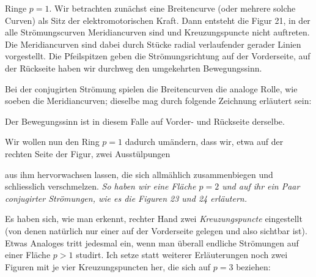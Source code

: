 \documentclass{article}
\begin{document}
Ringe $p = 1$. Wir betrachten zunächst eine Breitencurve (oder mehrere solche Curven) als Sitz der elektromotorischen Kraft. Dann entsteht die Figur 21, in der alle Strömungscurven Meridiancurven sind und Kreuzungspuncte nicht auftreten. Die Meridiancurven sind dabei durch Stücke radial verlaufender gerader Linien vorgestellt. Die Pfeilspitzen geben die Strömungsrichtung auf der Vorderseite, auf der Rückseite haben wir durchweg den umgekehrten Bewegungssinn.

Bei der conjugirten Strömung spielen die Breitencurven die analoge Rolle, wie soeben die Meridiancurven; dieselbe mag durch folgende Zeichnung erläutert sein:


Der Bewegungssinn ist in diesem Falle auf Vorder- und Rückseite derselbe.


Wir wollen nun den Ring $p = 1$ dadurch umändern, dass wir, etwa auf der rechten Seite der Figur, zwei Ausstülpungen

aus ihm hervorwachsen lassen, die sich allmählich zusammenbiegen und schliesslich verschmelzen. \emph{So haben wir eine Fläche $p = 2$ und auf ihr ein Paar conjugirter Strömungen, wie es die Figuren 23 und 24 erläutern.}

Es haben sich, wie man erkennt, rechter Hand zwei \emph{Kreuzungspuncte} eingestellt (von denen natürlich nur einer auf der Vorderseite gelegen und also sichtbar ist). Etwas Analoges tritt jedesmal ein, wenn man überall endliche Strömungen auf einer Fläche $p > 1$ studirt. Ich setze statt weiterer Erläuterungen noch zwei Figuren mit je vier Kreuzungspuncten her, die sich auf $p = 3$ beziehen:
\end{document}
